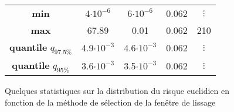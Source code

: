 \begin{figure}
\begin{tabularx}{\textwidth}{ccccc}
		\toprule
		\textbf{min}                        & 4$\cdot 10^{-6}$    & 6$\cdot 10^{-6}$   & 0.062    & $\vdots$  \\
		\textbf{max}                        & 67.89               & 0.01               & 0.062    & 210       \\
		\textbf{quantile} $q_{97.5\%}$      & 4.9$\cdot 10^{-3}$  & 4.6$\cdot 10^{-3}$ & 0.062    & $\vdots$  \\
		\textbf{quantile} $q_{95\%}$        & 3.6$\cdot 10^{-3}$  & 3.5$\cdot 10^{-3}$ & 0.062    & $\vdots$  \\

		\bottomrule
	\end{tabularx}
	\caption{Quelques statistiques sur la distribution du risque euclidien en fonction de la méthode de sélection de la fenêtre de lissage}
	\label{tab:stat_R_eucl_min_max_q}
\end{figure}



